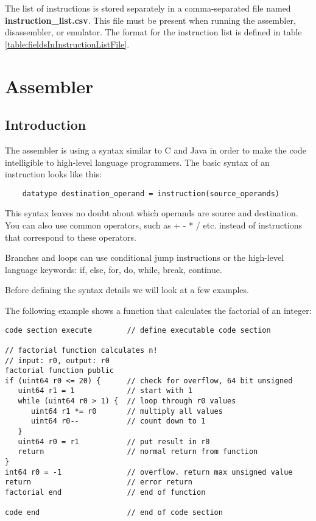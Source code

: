 \documentclass[forwardcom.tex]{subfiles}
\begin{document}
The list of instructions is stored separately in a comma-separated file named \textbf{instruction\_list.csv}. This file must be present when running the assembler, disassembler, or emulator. The format for the instruction list is defined in table \ref{table:fieldsInInstructionListFile}.
\vspace{2mm}


\section{Assembler}\label{chap:assembler}
\subsection{Introduction} \label{assemblerIntroduction}
The assembler is using a syntax similar to C and Java in order to make the code intelligible to 
high-level language programmers. The basic syntax of an instruction looks like this:
\vspace{2mm}

\begin{lstlisting}
    datatype destination_operand = instruction(source_operands)
\end{lstlisting}
\vspace{2mm}

This syntax leaves no doubt about which operands are source and destination. 
You can also use common operators, such as + - * / etc. instead of instructions that correspond
to these operators.
\vspace{2mm}

Branches and loops can use conditional jump instructions or the high-level language keywords:
if, else, for, do, while, break, continue.
\vspace{2mm}

Before defining the syntax details we will look at a few examples.
\vspace{2mm}

The following example shows a function that calculates the factorial of an integer:


\begin{example}
\label{exampleFactorial}
\end{example} %
\begin{lstlisting}[frame=single]
code section execute        // define executable code section

// factorial function calculates n!
// input: r0, output: r0
factorial function public
if (uint64 r0 <= 20) {      // check for overflow, 64 bit unsigned
   uint64 r1 = 1            // start with 1
   while (uint64 r0 > 1) {  // loop through r0 values
      uint64 r1 *= r0       // multiply all values
      uint64 r0--           // count down to 1
   }
   uint64 r0 = r1           // put result in r0
   return                   // normal return from function
}
int64 r0 = -1               // overflow. return max unsigned value
return                      // error return
factorial end               // end of function

code end                    // end of code section
\end{lstlisting}
\vspace{4mm}
\end{document}
